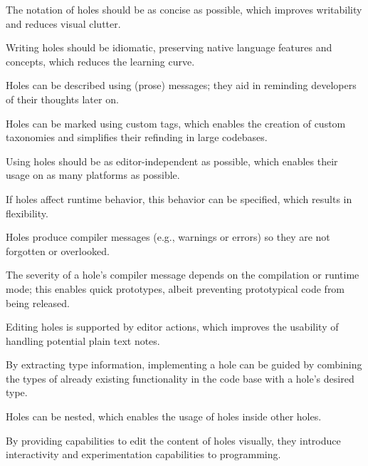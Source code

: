 \begin{properties}
    \item The notation of holes should be as concise as possible, which improves writability and reduces visual clutter.\label{hp:concise}
    \item Writing holes should be idiomatic, preserving native language features and concepts, which reduces the learning curve.\label{hp:idiomatic}
    \item Holes can be described using (prose) messages; they aid in reminding developers of their thoughts later on.\label{hp:prose-message}
    \item Holes can be marked using custom tags, which enables the creation of custom taxonomies and simplifies their refinding in large codebases.\label{hp:taggable}
    \item Using holes should be as editor-independent as possible, which enables their usage on as many platforms as possible.\label{hp:editor-independence}
    \item If holes affect runtime behavior, this behavior can be specified, which results in flexibility.\label{hp:runtime-behavior}
    \item Holes produce compiler messages (e.g., warnings or errors) so they are not forgotten or overlooked.\label{hp:compile-warnings}
    \item The severity of a hole's compiler message depends on the compilation or runtime mode; this enables quick prototypes, albeit preventing prototypical code from being released.\label{hp:severity-modes}
    \item Editing holes is supported by editor actions, which improves the usability of handling potential plain text notes.\label{hp:supported-editor-actions}
    \item By extracting type information, implementing a hole can be guided by combining the types of already existing functionality in the code base with a hole's desired type.\label{hp:matchable-via-types}
    \item Holes can be nested, which enables the usage of holes inside other holes.\label{hp:nestable}
    \item By providing capabilities to edit the content of holes visually, they introduce interactivity and experimentation capabilities to programming.\label{hp:visually-editable}
\end{properties}
